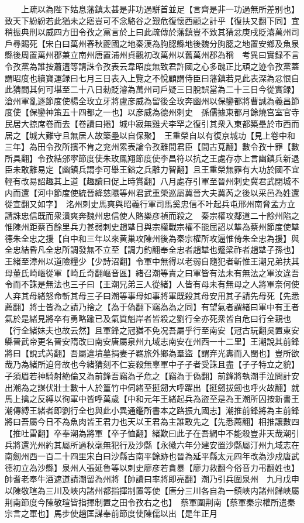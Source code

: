 　　上疏以為陛下姑息藩鎮太甚是非功過駢首並足【言齊是非一功過無所差别也】致天下紛紛若此猶未之寤豈可不念駱谷之艱危復懷西顧之計乎【復扶又翻下同】宜稍振典刑以威四方田令孜之黨言於上曰此疏傳於藩鎮豈不致其猜忿庚戌貶濬萬州司戶尋賜死【宋白曰萬州春秋夔國之地秦漢為朐䏰縣地後魏分朐䏰之地置安鄉及魚泉縣後周置萬州郡兼立南州唐置浦州貞觀初改萬州以舊萬州郡為稱　考異曰實録不言令孜黨為誰按蕭遘等請誅令孜表云韋昭度無致君許國之心多醜正比頑之迹令孜黨蓋謂昭度也續寶運録曰七月三日表入上覽之不悅顧謂侍臣曰藩鎮若見此表深為忿恨自此猜間其何可堪至二十八日勑貶濬為萬州司戶疑三日脫誤當為二十三日今從實録】　滄州軍亂逐節度使楊全玫立牙將盧彦威為留後全玫奔幽州以保鑾都將曹誠為義昌節度使【保鑾神策五十四都之一也】以彦威為德州刺史　孫儒據東都月餘燒宫室官寺民居大掠席卷而去【卷讀曰捲】城中寂無雞犬李罕之復引其衆入東都築壘於市西而居之【城大難守且無居人故築壘以自保聚】　王重榮自以有復京城功【見上卷中和三年】為田令孜所擯不肯之兖州累表論令孜離間君臣【間古莧翻】數令孜十罪【數所具翻】令孜結邠寜節度使朱玫鳳翔節度使李昌符以抗之王處存亦上言幽鎮兵新退臣未敢離易定【幽鎮兵謂李可舉王鎔之兵離力智翻】且王重榮無罪有大功於國不宜輕有改易詔趣其上道【趣讀曰促上時賞翻】八月處存引軍至晉州刺史冀君武閉城不内而還【河中節度使統晉絳慈隰等州君武重榮巡屬冀晉大夫冀芮之後以采邑為姓還從宣翻又如字】　洺州刺史馬爽與昭義行軍司馬奚忠信不叶起兵屯邢州南脅孟方立請誅忠信既而衆潰爽奔魏州忠信使人賂樂彦禎而殺之　秦宗權攻鄰道二十餘州陷之惟陳州距蔡百餘里兵力甚弱刺史趙犨日與宗權戰宗權不能屈詔以犨為蔡州節度使犨德朱全忠之援【自中和三年以來黄巢攻陳州後為秦宗權所攻逼惟倚朱全忠為援】與全忠結昏凡全忠所調發無不立至【調力釣翻奉全忠者趙犨也蹙梁祚者趙犨子孫也】　王緒至漳州以道險糧少【少詩沼翻】令軍中無得以老弱自隨犯者斬惟王潮兄弟扶其母董氏崎嶇從軍【崎丘奇翻嶇音區】緒召潮等責之曰軍皆有法未有無法之軍汝違吾令而不誅是無法也三子曰【王潮兄弟三人從緒】人皆有母未有無母之人將軍奈何使人弃其母緒怒命斬其母三子曰潮等事母如事將軍既殺其母安用其子請先母死【先悉薦翻】將士皆為之請乃捨之【為于偽翻下竊為為之同】有望氣者謂緒曰軍中有王者氣於是緒見將卒有勇略踰已及氣質魁岸者皆殺之劉行全亦死衆皆自危曰行全親也【行全緒妹夫也故云然】且軍鋒之冠猶不免况吾屬乎行至南安【冠古玩翻吳置東安縣晉武帝更名晉安隋改曰南安唐屬泉州九域志南安在州西一十二里】王潮說其前鋒將曰【說式芮翻】吾屬違墳墓捐妻子羈旅外鄉為羣盜【謂弃光夀而入閩也】豈所欲哉乃為緒所迫脅故也今緒猜刻不仁妄殺無辜軍中孑孑者受誅且盡【孑孑特立之貌】子須眉若神騎射絶倫又為前鋒吾竊為子危之【竊為于偽翻】前鋒將執潮手泣問計安出潮為之謀伏壯士數十人於篁竹中伺緒至挺劒大呼躍出【挺劒拔劒也呼火故翻】就馬上擒之反縛以徇軍中皆呼萬歲【中和元年王緒起兵為盜至是為王潮所囚按新書王潮傳縛王緒者即劉行全也與此小異通鑑所書本之路振九國志】潮推前鋒將為主前鋒將曰吾屬今日不為魚肉皆王君力也天以王君為主誰敢先之【先悉薦翻】相推讓數四【推吐雷翻】卒奉潮為將軍【卒子恤翻】緒歎曰此子在吾網中不能殺豈非天哉潮引兵將還光州約其屬所過秋毫無犯行及沙縣【永徽六年分建安置沙縣屬汀州九域志在南劒州西一百二十四里宋白曰沙縣古南平餘跡也晉為延平縣太元四年改為沙戍唐武德初立為沙縣】泉州人張延魯等以刺史廖彦若貪暴【廖力救翻今俗音力弔翻姓也】帥耆老奉牛酒遮道請潮留為州將【帥讀曰率將即亮翻】潮乃引兵圍泉州　九月戊申以陳敬瑄為三川及峽内諸州都指揮制置等使【唐分三川各自為一鎮峽内諸州歸峽屬荆南節度今陳敬瑄皆指揮制置之田令孜右之也】　蔡軍圍荆南【蔡軍秦宗權所遣秦宗言之軍也】馬步使趙匡謀奉前節度使陳儒以出【是年正月